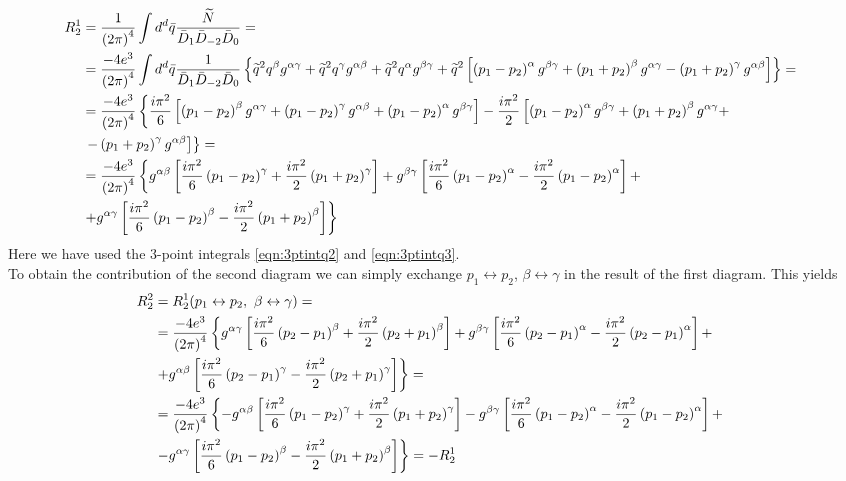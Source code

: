 \begin{align*}
R_2^1 & = \frac{1}{\left( 2\pi \right)^4} \int d^d\bar{q} \frac{\widetilde{N}}{\bar{D}_1\bar{D}_{-2}\bar{D}_0} = & \\
& = \frac{-4e^3}{\left( 2\pi \right)^4} \int d^d \bar{q} \frac{1}{\bar{D}_1\bar{D}_{-2}\bar{D}_0} \left\lbrace \widetilde{q}^2q^{\beta}g^{\alpha\gamma} + \widetilde{q}^2q^{\gamma}g^{\alpha\beta} + \widetilde{q}^2q^{\alpha}g^{\beta\gamma} + \widetilde{q}^2 \left[ \left( p_1 - p_2 \right)^{\alpha} g^{\beta\gamma} + \left( p_1 + p_2 \right)^{\beta} g^{\alpha\gamma} - \left( p_1 + p_2 \right)^{\gamma} g^{\alpha\beta} \right] \right\rbrace = & \\
& = \frac{-4e^3}{\left( 2\pi \right)^4} \left\lbrace \frac{i\pi^2}{6} \left[ \left( p_1-p_2 \right)^{\beta}g^{\alpha\gamma} + \left( p_1-p_2 \right)^{\gamma}g^{\alpha\beta} + \left( p_1-p_2 \right)^{\alpha}g^{\beta\gamma} \right] - \frac{i\pi^2}{2} \left[ \left( p_1-p_2 \right)^{\alpha} g^{\beta\gamma} + \left( p_1+p_2 \right)^{\beta} g^{\alpha\gamma} + \right. \right. & \\
& \left. \left. - \left( p_1+p_2 \right)^{\gamma} g^{\alpha\beta} \right] \right\rbrace = & \\
& = \frac{-4e^3}{\left( 2\pi \right)^4} \left\lbrace g^{\alpha\beta} \left[ \frac{i\pi^2}{6} \left( p_1-p_2 \right)^{\gamma} + \frac{i\pi^2}{2} \left( p_1+p_2 \right)^{\gamma} \right] + g^{\beta\gamma} \left[ \frac{i\pi^2}{6} \left( p_1-p_2 \right)^{\alpha} - \frac{i\pi^2}{2} \left( p_1-p_2 \right)^{\alpha} \right] + \right. & \\
& \left. + g^{\alpha\gamma} \left[ \frac{i\pi^2}{6} \left( p_1-p_2 \right)^{\beta} - \frac{i\pi^2}{2} \left( p_1+p_2 \right)^{\beta} \right] \right\rbrace &
\end{align*}
Here we have used the 3-point integrals \ref{eqn:3ptintq2} and \ref{eqn:3ptintq3}.\\
To obtain the contribution of the second diagram we can simply exchange $p_1 \leftrightarrow p_2$, $\beta \leftrightarrow \gamma$ in the result of the first diagram. This yields
\begin{align*}
R_2^2 & = R_2^1(p_1 \leftrightarrow p_2, \ \beta \leftrightarrow \gamma) = & \\
& = \frac{-4e^3}{\left( 2\pi \right)^4} \left\lbrace g^{\alpha\gamma} \left[ \frac{i\pi^2}{6} \left( p_2-p_1 \right)^{\beta} + \frac{i\pi^2}{2} \left( p_2+p_1 \right)^{\beta} \right] + g^{\beta\gamma} \left[ \frac{i\pi^2}{6} \left( p_2-p_1 \right)^{\alpha} - \frac{i\pi^2}{2} \left( p_2-p_1 \right)^{\alpha} \right] + \right. & \\
& \left. + g^{\alpha\beta} \left[ \frac{i\pi^2}{6} \left( p_2-p_1 \right)^{\gamma} - \frac{i\pi^2}{2} \left( p_2+p_1 \right)^{\gamma} \right] \right\rbrace = & \\
& = \frac{-4e^3}{\left( 2\pi \right)^4} \left\lbrace -g^{\alpha\beta} \left[ \frac{i\pi^2}{6} \left( p_1-p_2 \right)^{\gamma} + \frac{i\pi^2}{2} \left( p_1+p_2 \right)^{\gamma} \right] - g^{\beta\gamma} \left[ \frac{i\pi^2}{6} \left( p_1-p_2 \right)^{\alpha} - \frac{i\pi^2}{2} \left( p_1-p_2 \right)^{\alpha} \right] + \right. & \\
& \left. - g^{\alpha\gamma} \left[ \frac{i\pi^2}{6} \left( p_1-p_2 \right)^{\beta} - \frac{i\pi^2}{2} \left( p_1+p_2 \right)^{\beta} \right] \right\rbrace = -R_2^1 &
\end{align*}
